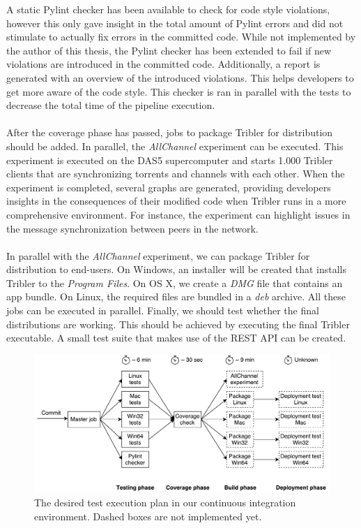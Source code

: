 A static Pylint checker has been available to check for code style violations, however this only gave insight in the total amount of Pylint errors and did not stimulate to actually fix errors in the committed code. While not implemented by the author of this thesis, the Pylint checker has been extended to fail if new violations are introduced in the committed code. Additionally, a report is generated with an overview of the introduced violations. This helps developers to get more aware of the code style. This checker is ran in parallel with the tests to decrease the total time of the pipeline execution.\\\\
After the coverage phase has passed, jobs to package Tribler for distribution should be added. In parallel, the \emph{AllChannel} experiment can be executed. This experiment is executed on the DAS5 supercomputer and starts 1.000 Tribler clients that are synchronizing torrents and channels with each other. When the experiment is completed, several graphs are generated, providing developers insights in the consequences of their modified code when Tribler runs in a more comprehensive environment. For instance, the experiment can highlight issues in the message synchronization between peers in the network.\\\\
In parallel with the \emph{AllChannel} experiment, we can package Tribler for distribution to end-users. On Windows, an installer will be created that installs Tribler to the \emph{Program Files}. On OS X, we create a \emph{DMG} file that contains an app bundle. On Linux, the required files are bundled in a \emph{deb} archive. All these jobs can be executed in parallel. Finally, we should test whether the final distributions are working. This should be achieved by executing the final Tribler executable. A small test suite that makes use of the REST API can be created.

\begin{figure}[h!]
	\centering
	\includegraphics[width=0.9\columnwidth]{images/improving_qa/jenkins_pipeline}
	\caption{The desired test execution plan in our continuous integration environment. Dashed boxes are not implemented yet.}
	\label{fig:jenkins-pipeline}
\end{figure}

